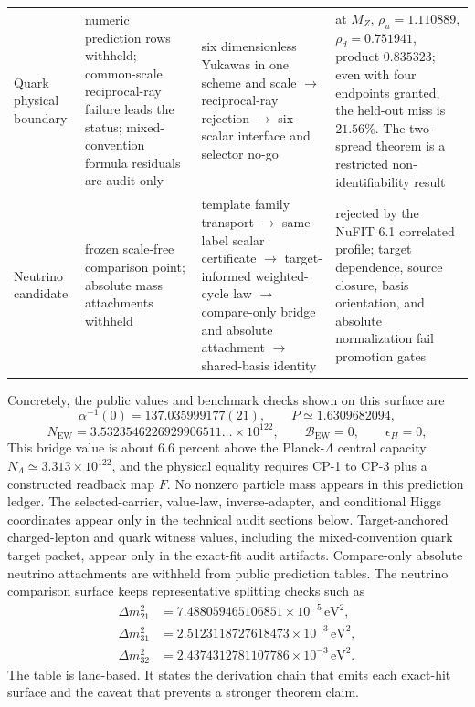 \documentclass[11pt]{article}
\begin{document}
\begin{table}[h]
\begin{tabular}{@{}>{\raggedright\arraybackslash}p{}>{\raggedright\arraybackslash}p{}>{\raggedright\arraybackslash}p{}>{\raggedright\arraybackslash}p{}@{}}
Quark physical boundary & numeric prediction rows withheld; common-scale reciprocal-ray failure leads the status; mixed-convention formula residuals are audit-only & six dimensionless Yukawas in one scheme and scale \(\rightarrow\) reciprocal-ray rejection \(\rightarrow\) six-scalar interface and selector no-go & at \(M_Z\), \(\rho_u=1.110889\), \(\rho_d=0.751941\), product \(0.835323\); even with four endpoints granted, the held-out miss is \(21.56\%\). The two-spread theorem is a restricted non-identifiability result \\
Neutrino candidate & frozen scale-free comparison point; absolute mass attachments withheld & template family transport \(\rightarrow\) same-label scalar certificate \(\rightarrow\) target-informed weighted-cycle law \(\rightarrow\) compare-only bridge and absolute attachment \(\rightarrow\) shared-basis identity & rejected by the NuFIT 6.1 correlated profile; target dependence, source closure, basis orientation, and absolute normalization fail promotion gates~\cite{nufit61} \\
\bottomrule
\end{tabular}
\end{table}

Concretely, the public values and benchmark checks shown on this surface are
\[
\alpha^{-1}(0)=137.035999177(21),
\qquad
P\simeq1.6309682094,
\]
\[
N_{\mathrm{EW}}
=
3.5323546226929906511\ldots\times10^{122},
\qquad
\mathcal B_{\mathrm{EW}}=0,
\qquad
\epsilon_H=0,
\]
This bridge value is about \(6.6\) percent above the Planck-\(\Lambda\) central capacity
\(N_\Lambda\simeq3.313\times10^{122}\), and the physical equality requires CP-1 to CP-3 plus a
constructed readback map \(F\). No nonzero particle mass appears in this prediction ledger. The selected-carrier, value-law,
inverse-adapter, and conditional Higgs coordinates appear only in the technical audit
sections below. Target-anchored charged-lepton
and quark witness values, including the mixed-convention quark target packet, appear only in
the exact-fit audit artifacts. Compare-only absolute neutrino attachments are withheld
from public prediction tables. The neutrino comparison surface keeps representative splitting
checks such as
\[
\begin{aligned}
\Delta m_{21}^2&=7.488059465106851\times10^{-5}\,\mathrm{eV}^2,\\
\Delta m_{31}^2&=2.5123118727618473\times10^{-3}\,\mathrm{eV}^2,\\
\Delta m_{32}^2&=2.4374312781107786\times10^{-3}\,\mathrm{eV}^2.
\end{aligned}
\]
The table is lane-based. It states the derivation chain that emits each exact-hit surface and the caveat that prevents a stronger theorem claim.
\end{document}
